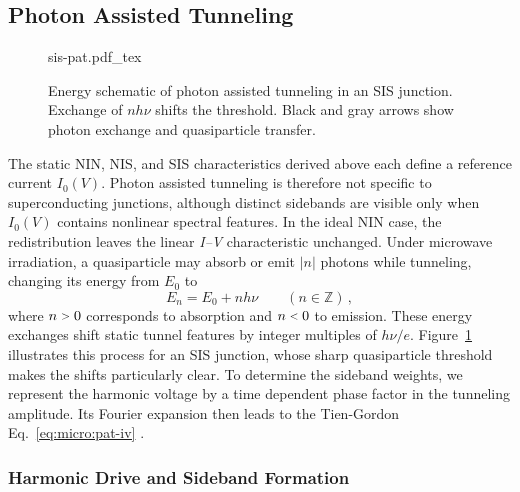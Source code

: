     \subsection{Photon Assisted Tunneling}
    \label{subsec:micro:pat}

        \begin{figure}
            \captionsetup{format=plain}%
            \centering
            \vspace{-1em}
            {sis-pat.pdf_tex}
            \caption{
                Energy schematic of photon assisted tunneling in an SIS junction. Exchange of $nh\nu$ shifts the threshold. Black and gray arrows show photon exchange and quasiparticle transfer.
                }
            \label{fig:micro:pat-schematic}
        \end{figure}
        The static NIN, NIS, and SIS characteristics derived above each define a reference current $I_0(V)$. Photon assisted tunneling is therefore not specific to superconducting junctions, although distinct sidebands are visible only when $I_0(V)$ contains nonlinear spectral features. In the ideal NIN case, the redistribution leaves the linear \textit{I--V} characteristic unchanged. Under microwave irradiation, a quasiparticle may absorb or emit $|n|$ photons while tunneling, changing its energy from $E_0$ to
        \begin{equation}
            E_n = E_0 + n h\nu \qquad (n\in\mathbb{Z})\,,
        \end{equation}
        where $n\sgt{}0$ corresponds to absorption and $n\slt{}0$ to emission. These energy exchanges shift static tunnel features by integer multiples of $h\nu/e$. Figure~\ref{fig:micro:pat-schematic} illustrates this process for an SIS junction, whose sharp quasiparticle threshold makes the shifts particularly clear. To determine the sideband weights, we represent the harmonic voltage by a time dependent phase factor in the tunneling amplitude. Its Fourier expansion then leads to the Tien-Gordon Eq.~\eqref{eq:micro:pat-iv} \cite{tien_multiphoton_1963}.

        \subsubsection*{Harmonic Drive and Sideband Formation}

